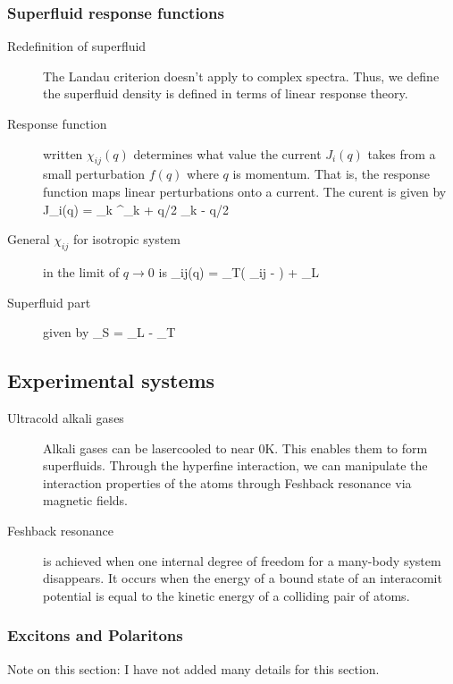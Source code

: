 \subsubsection{Superfluid response functions}
\begin{description}
\item[Redefinition of superfluid] The Landau criterion doesn't apply to complex spectra. Thus, we define the superfluid density is defined in terms of linear response theory. 

\item[Response function] written $\chi_{ij}(q)$ determines what value the current $J_i(q)$ takes from a small perturbation $f(q)$ where $q$ is momentum. That is, the response function maps linear perturbations onto a current. The curent is given by 
\beq
J_i(q) = \sum_k  \psi^\dagger_{k + q/2} \psi_{k - q/2}
\eeq

\item[General $\chi_{ij}$ for isotropic system] in the limit of $q \rightarrow 0$ is 
\beq
\chi_{ij}(q) = \chi_T\left( \delta_{ij} -  \right) + \chi_L 
\eeq


\item[Superfluid part] given by 
\beq
\chi_S = \chi_L - \chi_T
\eeq


\end{description}

\subsection{Experimental systems}
\begin{description}
\item[Ultracold alkali gases] Alkali gases can be lasercooled to near 0K. This enables them to form superfluids. Through the hyperfine interaction, we can manipulate the interaction properties of the atoms through Feshback resonance via magnetic fields. 

\item[Feshback resonance] is achieved when one internal degree of freedom for a many-body system disappears. It occurs when the energy of a bound state of an interacomit potential is equal to the kinetic energy of a colliding pair of atoms. 


\end{description}
\subsubsection{Excitons and Polaritons}
Note on this section: I have not added many details for this section. 

